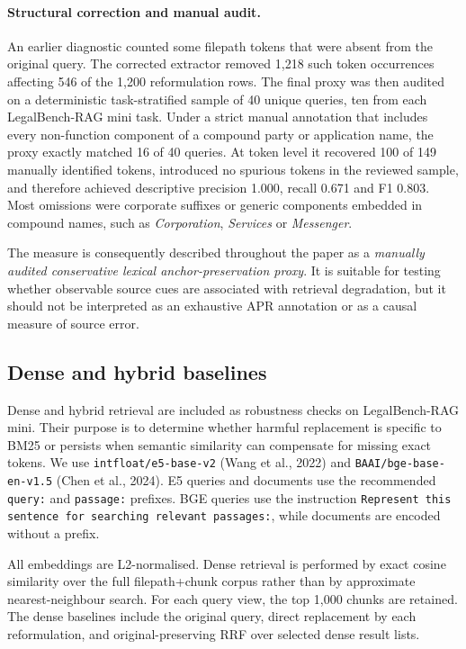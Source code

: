 \documentclass[a4paper,fleqn]{cas-dc}
\begin{document}
\paragraph{Structural correction and manual audit.}
An earlier diagnostic counted some filepath tokens that were absent from
the original query. The corrected extractor removed 1,218 such token
occurrences affecting 546 of the 1,200 reformulation rows. The final
proxy was then audited on a deterministic task-stratified sample of 40
unique queries, ten from each LegalBench-RAG mini task. Under a strict
manual annotation that includes every non-function component of a
compound party or application name, the proxy exactly matched 16 of 40
queries. At token level it recovered 100 of 149 manually identified
tokens, introduced no spurious tokens in the reviewed sample, and
therefore achieved descriptive precision 1.000, recall 0.671 and
F1 0.803. Most omissions were corporate suffixes or generic components
embedded in compound names, such as \textit{Corporation},
\textit{Services} or \textit{Messenger}.

The measure is consequently described throughout the paper as a
\textit{manually audited conservative lexical anchor-preservation
proxy}. It is suitable for testing whether observable source cues are
associated with retrieval degradation, but it should not be interpreted
as an exhaustive APR annotation or as a causal measure of source error.

\subsection{Dense and hybrid baselines}

Dense and hybrid retrieval are included as robustness checks on
LegalBench-RAG mini. Their purpose is to determine whether harmful
replacement is specific to BM25 or persists when semantic
similarity can compensate for missing exact tokens. We use
\texttt{intfloat/e5-base-v2} (Wang et al., 2022) and
\texttt{BAAI/bge-base-en-v1.5} (Chen et al., 2024). E5 queries and
documents use the recommended \texttt{query:} and \texttt{passage:}
prefixes. BGE queries use the instruction
\texttt{Represent this sentence for searching relevant passages:},
while documents are encoded without a prefix.

All embeddings are L2-normalised. Dense retrieval is performed by
exact cosine similarity over the full filepath+chunk corpus rather
than by approximate nearest-neighbour search. For each query view,
the top 1,000 chunks are retained. The dense baselines include the
original query, direct replacement by each reformulation, and
original-preserving RRF over selected dense result lists.
\end{document}
